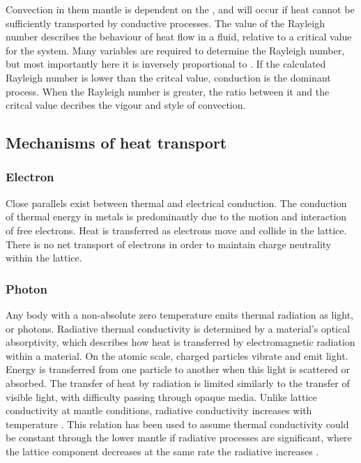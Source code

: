Convection in them mantle is dependent on the \tc, and will occur if heat cannot be sufficiently transported by conductive processes. The value of the Rayleigh number describes the behaviour of heat flow in a fluid, relative to a critical value for the system. Many variables are required to determine the Rayleigh number, but most importantly here it is inversely proportional to \tc. If the calculated Rayleigh number is lower than the critcal value, conduction is the dominant process. When the Rayleigh number is greater, the ratio between it and the critcal value decribes the vigour and style of convection.

\subsection{Mechanisms of heat transport}

\subsubsection{Electron}

Close parallels exist between thermal and electrical conduction. The conduction of thermal energy in metals is predominantly due to the motion and interaction of free electrons. Heat is transferred as electrons move and collide in the lattice. There is no net transport of electrons in order to maintain charge neutrality within the lattice.

\subsubsection{Photon}

Any body with a non-absolute zero temperature emits thermal radiation as light, or photons. Radiative thermal conductivity is determined by a material's optical absorptivity, which describes how heat is transferred by electromagnetic radiation within a material. On the atomic scale, charged particles vibrate and emit light. Energy is transferred from one particle to another when this light is scattered or absorbed. The transfer of heat by radiation is limited similarly to the transfer of visible light, with difficulty passing through opaque media. Unlike lattice conductivity at mantle conditions, radiative conductivity increases with temperature \citep{Hofmeister1999}. This relation has been used to assume thermal conductivity could be constant through the lower mantle if radiative processes are significant, where the lattice component decreases at the same rate the radiative increases \citep{Tang2014}.

